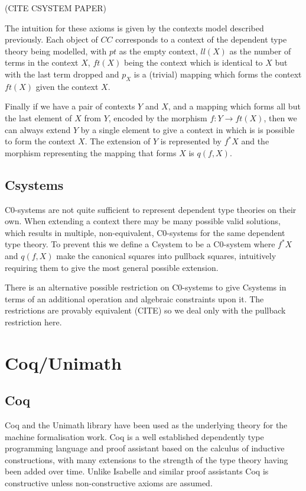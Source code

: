 \documentclass[12pt,a4paper,twoside,openright]{report}
\begin{document}
(CITE CSYSTEM PAPER)

The intuition for these axioms is given by the contexts model described
previously. Each object of $CC$ corresponds to a context of the dependent type
theory being modelled, with $pt$ as the empty context, $ll(X)$ as the number of
terms in the context $X$, $ft(X)$ being the context which is identical to $X$
but with the last term dropped and $p_X$ is a (trivial) mapping which forms the
context $ft(X)$ given the context $X$.

Finally if we have a pair of contexts $Y$ and $X$, and a mapping which forms all
but the last element of $X$ from $Y$, encoded by the morphism $f: Y\to ft(X)$,
then we can always extend $Y$ by a single element to give a context in which is
is possible to form the context $X$. The extension of $Y$ is represented by
$f^*X$ and the morphism representing the mapping that forms $X$ is $q(f, X)$.

\subsection{Csystems}
C0-systems are not quite sufficient to represent dependent type theories on
their own. When extending a context there may be many possible valid solutions,
which results in multiple, non-equivalent, C0-systems for the same dependent
type theory. To prevent this we define a Csystem to be a C0-system where $f^*X$
and $q(f, X)$ make the canonical squares into pullback squares, intuitively
requiring them to give the most general possible extension.

There is an alternative possible restriction on C0-systems to give Csystems in
terms of an additional operation and algebraic constraints upon it. The
restrictions are provably equivalent (CITE) so we deal only with the pullback
restriction here.

\section{Coq/Unimath}
\subsection{Coq}
Coq and the Unimath library have been used as the underlying theory for the
machine formalisation work. Coq is a well established dependently type
programming language and proof assistant based on the calculus of inductive
constructions, with many extensions to the strength of the type theory having
been added over time. Unlike Isabelle and similar proof assistants Coq is
constructive unless non-constructive axioms are assumed. 
\end{document}
